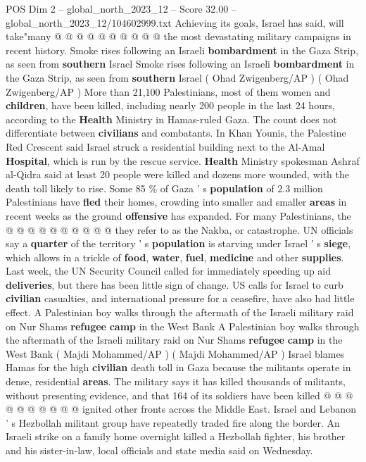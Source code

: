 \begin{textsample}{POS Dim 2 – global\_north\_2023\_12 – Score 32.00 – global\_north\_2023\_12/104602999.txt}
Achieving its goals, Israel has said, will take"many @ @ @ @ @ @ @ @ @ @ the most devastating military campaigns in recent history.
Smoke rises following an Israeli \textbf{bombardment} in the Gaza Strip, as seen from \textbf{southern} Israel Smoke rises following an Israeli \textbf{bombardment} in the Gaza Strip, as seen from \textbf{southern} Israel ( Ohad Zwigenberg/AP ) ( Ohad Zwigenberg/AP ) More than 21,100 Palestinians, most of them women and \textbf{children}, have been killed, including nearly 200 people in the last 24 hours, according to the \textbf{Health} Ministry in Hamas-ruled Gaza.
The count does not differentiate between \textbf{civilians} and combatants.
In Khan Younis, the Palestine Red Crescent said Israel struck a residential building next to the Al-Amal \textbf{Hospital}, which is run by the rescue service. \textbf{Health} Ministry spokesman Ashraf al-Qidra said at least 20 people were killed and dozens more wounded, with the death toll likely to rise.
Some 85 \% of Gaza ' s \textbf{population} of 2.3 million Palestinians have \textbf{fled} their homes, crowding into smaller and smaller \textbf{areas} in recent weeks as the ground \textbf{offensive} has expanded.
For many Palestinians, the @ @ @ @ @ @ @ @ @ @ they refer to as the Nakba, or catastrophe.
UN officials say a \textbf{quarter} of the territory ' s \textbf{population} is starving under Israel ' s \textbf{siege}, which allows in a trickle of \textbf{food}, \textbf{water}, \textbf{fuel}, \textbf{medicine} and other \textbf{supplies}.
Last week, the UN Security Council called for immediately speeding up aid \textbf{deliveries}, but there has been little sign of change.
US calls for Israel to curb \textbf{civilian} casualties, and international pressure for a ceasefire, have also had little effect.
A Palestinian boy walks through the aftermath of the Israeli military raid on Nur Shams \textbf{refugee} \textbf{camp} in the West Bank A Palestinian boy walks through the aftermath of the Israeli military raid on Nur Shams \textbf{refugee} \textbf{camp} in the West Bank ( Majdi Mohammed/AP ) ( Majdi Mohammed/AP ) Israel blames Hamas for the high \textbf{civilian} death toll in Gaza because the militants operate in dense, residential \textbf{areas}.
The military says it has killed thousands of militants, without presenting evidence, and that 164 of its soldiers have been killed @ @ @ @ @ @ @ @ @ @ ignited other fronts across the Middle East.
Israel and Lebanon ' s Hezbollah militant group have repeatedly traded fire along the border.
An Israeli strike on a family home overnight killed a Hezbollah fighter, his brother and his sister-in-law, local officials and state media said on Wednesday.

\end{textsample}
